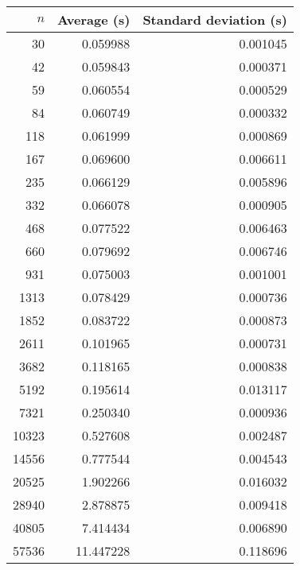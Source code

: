 \begin{tabular}{rrr}
$n$ & Average (s) & Standard deviation (s)\\\hline
30 & 0.059988 & 0.001045\\
42 & 0.059843 & 0.000371\\
59 & 0.060554 & 0.000529\\
84 & 0.060749 & 0.000332\\
118 & 0.061999 & 0.000869\\
167 & 0.069600 & 0.006611\\
235 & 0.066129 & 0.005896\\
332 & 0.066078 & 0.000905\\
468 & 0.077522 & 0.006463\\
660 & 0.079692 & 0.006746\\
931 & 0.075003 & 0.001001\\
1313 & 0.078429 & 0.000736\\
1852 & 0.083722 & 0.000873\\
2611 & 0.101965 & 0.000731\\
3682 & 0.118165 & 0.000838\\
5192 & 0.195614 & 0.013117\\
7321 & 0.250340 & 0.000936\\
10323 & 0.527608 & 0.002487\\
14556 & 0.777544 & 0.004543\\
20525 & 1.902266 & 0.016032\\
28940 & 2.878875 & 0.009418\\
40805 & 7.414434 & 0.006890\\
57536 & 11.447228 & 0.118696\\
\end{tabular}
